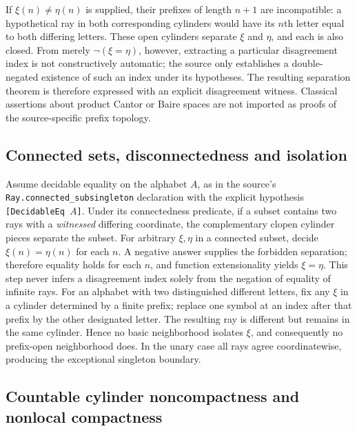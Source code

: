 If $\xi(n)\ne\eta(n)$ is supplied, their prefixes of length $n+1$ are incompatible: a hypothetical ray in both corresponding cylinders would have its $n$th letter equal to both differing letters. These open cylinders separate $\xi$ and $\eta$, and each is also closed. From merely $\neg(\xi=\eta)$, however, extracting a particular disagreement index is not constructively automatic; the source only establishes a double-negated existence of such an index under its hypotheses. The resulting separation theorem is therefore expressed with an explicit disagreement witness. Classical assertions about product Cantor or Baire spaces are not imported as proofs of the source-specific prefix topology.

\subsection{Connected sets, disconnectedness and isolation}\label{supp:10-5}
\par{}\par\smallskip

Assume decidable equality on the alphabet $A$, as in the source's \texttt{Ray.}\allowbreak\texttt{connected\_}\allowbreak\texttt{subsingleton} declaration with the explicit hypothesis \texttt{[DecidableEq $A$]}. Under its connectedness predicate, if a subset contains two rays with a \emph{witnessed} differing coordinate, the complementary clopen cylinder pieces separate the subset. For arbitrary $\xi,\eta$ in a connected subset, decide $\xi(n)=\eta(n)$ for each $n$. A negative answer supplies the forbidden separation; therefore equality holds for each $n$, and function extensionality yields $\xi=\eta$. This step never infers a disagreement index solely from the negation of equality of infinite rays. For an alphabet with two distinguished different letters, fix any $\xi$ in a cylinder determined by a finite prefix; replace one symbol at an index after that prefix by the other designated letter. The resulting ray is different but remains in the same cylinder. Hence no basic neighborhood isolates $\xi$, and consequently no prefix-open neighborhood does. In the unary case all rays agree coordinatewise, producing the exceptional singleton boundary.

\subsection{Countable cylinder noncompactness and nonlocal compactness}\label{supp:10-6}
\par{}\par\smallskip

